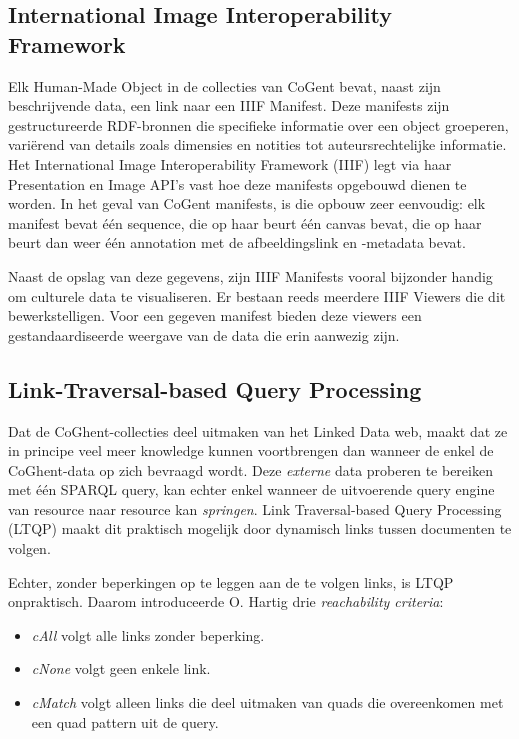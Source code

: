 \documentclass[conference]{IEEEtran}
\begin{document}
\subsection{International Image Interoperability Framework}
Elk Human-Made Object in de collecties van CoGent bevat, naast zijn beschrijvende data, een link naar een IIIF Manifest. Deze manifests zijn gestructureerde RDF-bronnen die specifieke informatie over een object groeperen, variërend van details zoals dimensies en notities tot auteursrechtelijke informatie. Het International Image Interoperability Framework (IIIF) legt via haar Presentation en Image API's vast hoe deze manifests opgebouwd dienen te worden. In het geval van CoGent manifests, is die opbouw zeer eenvoudig: elk manifest bevat één sequence, die op haar beurt één canvas bevat, die op haar beurt dan weer één annotation met de afbeeldingslink en -metadata bevat. \cite{appleby2017presentation} \cite{emanuel2018stitching} \cite{floreverk2022coghent}

Naast de opslag van deze gegevens, zijn IIIF Manifests vooral bijzonder handig om culturele data te visualiseren. Er bestaan reeds meerdere IIIF Viewers die dit bewerkstelligen. Voor een gegeven manifest bieden deze viewers een gestandaardiseerde weergave van de data die erin aanwezig zijn. \cite{snydman2015international}

\subsection{Link-Traversal-based Query Processing}
Dat de CoGhent-collecties deel uitmaken van het Linked Data web, maakt dat ze in principe veel meer knowledge kunnen voortbrengen dan wanneer de enkel de CoGhent-data op zich bevraagd wordt. Deze \textit{externe} data proberen te bereiken met één SPARQL query, kan echter enkel wanneer de uitvoerende query engine van resource naar resource kan \textit{springen}. Link Traversal-based Query Processing (LTQP) maakt dit praktisch mogelijk door dynamisch links tussen documenten te volgen. \cite{taelman2023ltqp}

Echter, zonder beperkingen op te leggen aan de te volgen links, is LTQP onpraktisch. Daarom introduceerde O. Hartig \cite{hartig2012foundations} drie \textit{reachability criteria}: 
\begin{itemize}
    \item \textit{cAll} volgt alle links zonder beperking.
    \item \textit{cNone} volgt geen enkele link.
    \item \textit{cMatch} volgt alleen links die deel uitmaken van quads die overeenkomen met een quad pattern uit de query.
\end{itemize}
\end{document}
